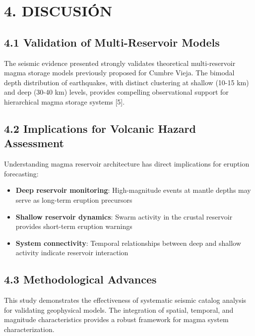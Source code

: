 \documentclass[
  spanish,
  letterpaper,
]{book}
\providecommand{\tightlist}{%
  \setlength{\itemsep}{0pt}\setlength{\parskip}{0pt}}
\begin{document}

\chapter{4. DISCUSIÓN}\label{discusiuxf3n}

\section{4.1 Validation of Multi-Reservoir
Models}\label{validation-of-multi-reservoir-models}

The seismic evidence presented strongly validates theoretical
multi-reservoir magma storage models previously proposed for Cumbre
Vieja. The bimodal depth distribution of earthquakes, with distinct
clustering at shallow (10-15 km) and deep (30-40 km) levels, provides
compelling observational support for hierarchical magma storage systems
{[}5{]}.

\section{4.2 Implications for Volcanic Hazard
Assessment}\label{implications-for-volcanic-hazard-assessment}

Understanding magma reservoir architecture has direct implications for
eruption forecasting:

\begin{itemize}
\tightlist
\item
  \textbf{Deep reservoir monitoring}: High-magnitude events at mantle
  depths may serve as long-term eruption precursors
\item
  \textbf{Shallow reservoir dynamics}: Swarm activity in the crustal
  reservoir provides short-term eruption warnings
\item
  \textbf{System connectivity}: Temporal relationships between deep and
  shallow activity indicate reservoir interaction
\end{itemize}

\section{4.3 Methodological Advances}\label{methodological-advances}

This study demonstrates the effectiveness of systematic seismic catalog
analysis for validating geophysical models. The integration of spatial,
temporal, and magnitude characteristics provides a robust framework for
magma system characterization.
\end{document}

